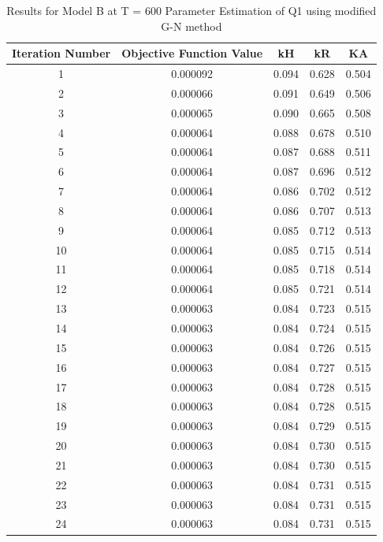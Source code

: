 \documentclass[a4paper,12pt]{article} %
\begin{document}
\begin{table}[ht]
\begin{tabular}{|c|c|c|c|c|}
        \hline
\end{tabular}
\end{table}
    
\begin{table}[ht]
    \caption{Results for Model B at T = 600 Parameter Estimation of Q1 using modified G-N method}
    \centering
    \begin{tabular}{|c|c|c|c|c|}
        \hline
        Iteration Number & Objective Function Value & kH & kR & KA \\
        \hline   
        1 & 0.000092 & 0.094 & 0.628 & 0.504 \\
        2 & 0.000066 & 0.091 & 0.649 & 0.506 \\
        3 & 0.000065 & 0.090 & 0.665 & 0.508 \\
        4 & 0.000064 & 0.088 & 0.678 & 0.510 \\
        5 & 0.000064 & 0.087 & 0.688 & 0.511 \\
        6 & 0.000064 & 0.087 & 0.696 & 0.512 \\
        7 & 0.000064 & 0.086 & 0.702 & 0.512 \\
        8 & 0.000064 & 0.086 & 0.707 & 0.513 \\
        9 & 0.000064 & 0.085 & 0.712 & 0.513 \\
        10 & 0.000064 & 0.085 & 0.715 & 0.514 \\
        11 & 0.000064 & 0.085 & 0.718 & 0.514 \\
        12 & 0.000064 & 0.085 & 0.721 & 0.514 \\
        13 & 0.000063 & 0.084 & 0.723 & 0.515 \\
        14 & 0.000063 & 0.084 & 0.724 & 0.515 \\
        15 & 0.000063 & 0.084 & 0.726 & 0.515 \\
        16 & 0.000063 & 0.084 & 0.727 & 0.515 \\
        17 & 0.000063 & 0.084 & 0.728 & 0.515 \\
        18 & 0.000063 & 0.084 & 0.728 & 0.515 \\
        19 & 0.000063 & 0.084 & 0.729 & 0.515 \\
        20 & 0.000063 & 0.084 & 0.730 & 0.515 \\
        21 & 0.000063 & 0.084 & 0.730 & 0.515 \\
        22 & 0.000063 & 0.084 & 0.731 & 0.515 \\
        23 & 0.000063 & 0.084 & 0.731 & 0.515 \\
        24 & 0.000063 & 0.084 & 0.731 & 0.515 \\

\end{tabular}
\end{table}
\end{document}
